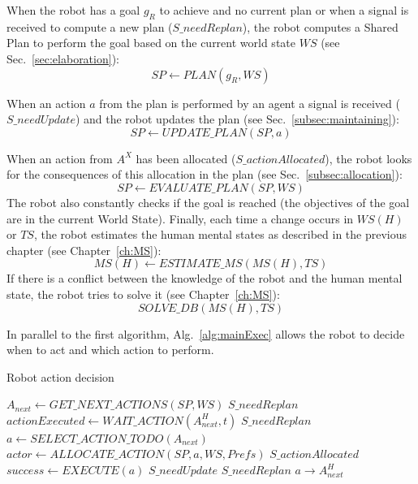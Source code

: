 \documentclass[english,a4paper,11pt,twoside]{StyleThese}
\begin{document}
When the robot has a goal $g_R$ to achieve and no current plan or when a signal is received to compute a new plan ($S\_needReplan$), the robot computes a Shared Plan to perform the goal based on the current world state $WS$ (see Sec.~\ref{sec:elaboration}):
$$SP \leftarrow PLAN(g_R, WS)$$

When an action $a$ from the plan is performed by an agent a signal is received ($S\_needUpdate$) and the robot updates the plan (see Sec.~\ref{subsec:maintaining}):
$$SP \leftarrow UPDATE\_PLAN(SP, a)$$

When an action from $A^X$ has been allocated ($S\_actionAllocated$), the robot looks for the consequences of this allocation in the plan (see Sec.~\ref{subsec:allocation}):
$$SP \leftarrow EVALUATE\_ PLAN(SP, WS)$$
The robot also constantly checks if the goal is reached (the objectives of the goal are in the current World State).
Finally, each time a change occurs in $WS(H)$ or $TS$, the robot estimates the human mental states as described in the previous chapter (see Chapter~\ref{ch:MS}):
$$MS(H) \leftarrow ESTIMATE\_MS(MS(H), TS)$$
If there is a conflict between the knowledge of the robot and the human mental state, the robot tries to solve it (see Chapter~\ref{ch:MS}): 
$$SOLVE\_DB(MS(H), TS)$$

In parallel to the first algorithm, Alg.~\ref{alg:mainExec} allows the robot to decide when to act and which action to perform. 


\begin{algorithm}
\caption{Robot action decision}
\label{alg:mainExec}
\begin{algorithmic}
\STATE $A_{next} \leftarrow GET\_NEXT\_ACTIONS(SP, WS)$
\STATE $S\_needReplan$
\STATE $actionExecuted \leftarrow WAIT\_ACTION(A^H_{next}, t)$
\STATE $S\_needReplan$
\ENDIF 
\ELSE
\STATE $a \leftarrow SELECT\_ACTION\_TODO(A_{next})$
\STATE $actor \leftarrow ALLOCATE\_ACTION(SP, a, WS, Prefs)$
\STATE $S\_actionAllocated$
\ENDIF
{}
\STATE $success \leftarrow EXECUTE(a)$
\STATE $S\_needUpdate$
\ELSE 
\STATE $S\_needReplan$
\ENDIF
{}
\STATE $a \rightarrow A^H_{next}$
\ENDIF
\ENDIF
\ENDWHILE
\end{algorithmic}
\end{algorithm} 
\end{document}
